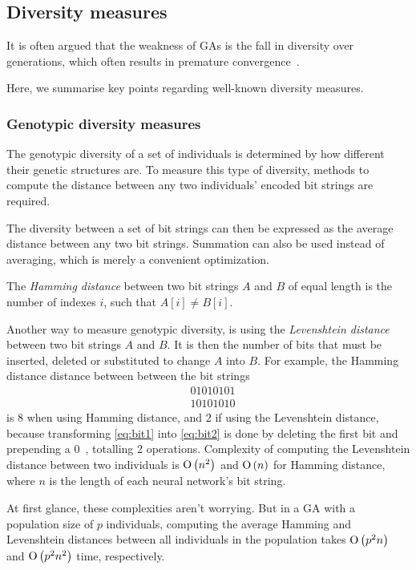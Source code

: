 \subsection{Diversity measures}
It is often argued that the weakness of GAs is the fall in diversity over generations, which often results in premature convergence~\cite{diaz2007empirical, 1266373,Zitzler00comparisonof}.

Here, we summarise key points regarding well-known diversity measures. %

\subsubsection{Genotypic diversity measures}
The genotypic diversity of a set of individuals is determined by how different their genetic structures are. To measure this type of diversity, methods to compute the distance between any two individuals' encoded bit strings are required.

The diversity between a set of bit strings can then be expressed as the average distance between any two bit strings. Summation can also be used instead of averaging, which is merely a convenient optimization.

The \emph{Hamming distance} between two bit strings $A$ and $B$ of equal length is the number of indexes $i$, such that $A[i] \neq B[i]$.

Another way to measure genotypic diversity, is using the \emph{Levenshtein distance} between two bit strings $A$ and $B$. It is then the number of bits that must be inserted, deleted or substituted to change $A$ into $B$. For example, the Hamming distance distance between between the bit strings
%
\begin{align}
&01010101\label{eq:bit1} \\
&10101010\label{eq:bit2}
\end{align}
%
is 8 when using Hamming distance, and 2 if using the Levenshtein distance, because transforming \cref{eq:bit1} into \cref{eq:bit2} is done by deleting the first bit and prepending a $0$~\cite{1250187}, totalling 2 operations. Complexity of computing the Levenshtein distance between two individuals is $\operatorname{O}\left(n^2\right)$ and $\operatorname{O}\left(n\right)$ for Hamming distance, where $n$ is the length of each neural network's bit string.

At first glance, these complexities aren't worrying. But in a GA with a population size of $p$ individuals, computing the average Hamming and Levenshtein distances between all individuals in the population takes $\operatorname{O}\left(p^2 n\right)$ and $\operatorname{O}\left(p^2 n^2\right)$ time, respectively. 

